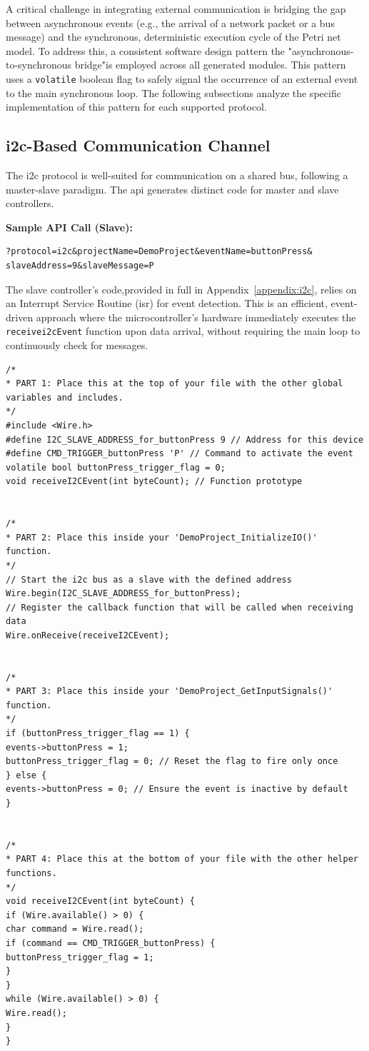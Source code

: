 A critical challenge in integrating external communication is bridging the gap between asynchronous events (e.g., the arrival of a network packet or a bus message) and the synchronous, deterministic execution cycle of the Petri net model. To address this, a consistent software design pattern the "asynchronous-to-synchronous bridge"is employed across all generated modules. This pattern uses a \texttt{volatile} boolean flag to safely signal the occurrence of an external event to the main synchronous loop. The following subsections analyze the specific implementation of this pattern for each supported protocol.

\subsection{\gls{i2c}-Based Communication Channel}
The \gls{i2c} protocol is well-suited for communication on a shared bus, following a master-slave paradigm. The \gls{api} generates distinct code for master and slave controllers.

\noindent\textbf{Sample API Call (Slave):}
\begin{verbatim}
?protocol=i2c&projectName=DemoProject&eventName=buttonPress&
slaveAddress=9&slaveMessage=P
\end{verbatim}

The slave controller's code,provided in full in Appendix~\ref{appendix:i2c}, relies on an Interrupt Service Routine (\gls{isr}) for event detection. This is an efficient, event-driven approach where the microcontroller's hardware immediately executes the \texttt{receive\gls{i2c}Event} function upon data arrival, without requiring the main loop to continuously check for messages.

\begin{verbatim}
/*
* PART 1: Place this at the top of your file with the other global 
variables and includes.
*/
#include <Wire.h>
#define I2C_SLAVE_ADDRESS_for_buttonPress 9 // Address for this device
#define CMD_TRIGGER_buttonPress 'P' // Command to activate the event
volatile bool buttonPress_trigger_flag = 0;
void receiveI2CEvent(int byteCount); // Function prototype


/*
* PART 2: Place this inside your 'DemoProject_InitializeIO()' function.
*/
// Start the i2c bus as a slave with the defined address
Wire.begin(I2C_SLAVE_ADDRESS_for_buttonPress);
// Register the callback function that will be called when receiving data
Wire.onReceive(receiveI2CEvent);


/*
* PART 3: Place this inside your 'DemoProject_GetInputSignals()' function.
*/
if (buttonPress_trigger_flag == 1) {
events->buttonPress = 1;
buttonPress_trigger_flag = 0; // Reset the flag to fire only once
} else {
events->buttonPress = 0; // Ensure the event is inactive by default
}


/*
* PART 4: Place this at the bottom of your file with the other helper functions.
*/
void receiveI2CEvent(int byteCount) {
if (Wire.available() > 0) {
char command = Wire.read();
if (command == CMD_TRIGGER_buttonPress) {
buttonPress_trigger_flag = 1;
}
}
while (Wire.available() > 0) {
Wire.read();
}
}
\end{verbatim}

